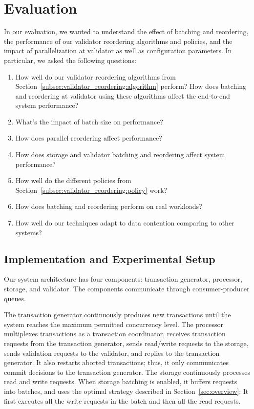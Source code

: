 \section{Evaluation}\label{sec:experiments}
In our evaluation, we wanted to understand the effect of batching and reordering, the performance of our validator reordering algorithms and policies, and the impact of parallelization at validator as well as configuration parameters. In particular, we asked the following questions:
\begin{enumerate}[leftmargin=*]
\item How well do our validator reordering algorithms from Section~\ref{subsec:validator_reordering:algorithm} perform? How does batching and reordering at validator using these algorithms affect the end-to-end system performance?
\item What's the impact of batch size on performance? 
\item How does parallel reordering affect performance?
\item How does storage and validator batching and reordering
  affect system performance?
\item How well do the different policies from Section~\ref{subsec:validator_reordering:policy} work?
\item How does batching and reordering perform on real workloads?
\item How well do our techniques adapt to data contention comparing to other systems?
\end{enumerate}

\subsection{Implementation and Experimental Setup}
\label{subsec:experiment:implementation}


Our system architecture has four components: transaction generator, processor, storage, and validator. The components communicate through consumer-producer queues.

The transaction generator continuously produces new transactions until the system reaches the maximum permitted concurrency level. The processor multiplexes transactions as a transaction coordinator, receives transaction requests from the transaction generator, sends read/write requests to the storage, sends validation requests to the validator, and replies to the transaction generator. It also restarts aborted transactions; thus, it only communicates commit decisions to the transaction generator. 
The storage continuously processes read and write requests. When storage batching is enabled, it buffers requests into batches, and uses the optimal strategy described in Section~\ref{sec:overview}: It first executes all the write requests in the batch  and then all the read requests. 


